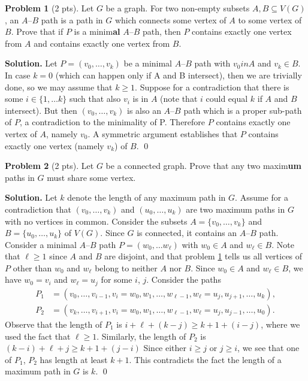 \documentclass[11pt]{scrartcl}
\theoremstyle{definition}
\newtheorem{problem}{Problem}
\newenvironment{solution}{\noindent\textbf{Solution.}}{\qed}
\begin{document}
\hrulefill

\begin{problem}[2 pts]\label{abpath}
Let $G$ be a graph.
For two non-empty subsets $A,B\subseteq V(G)$, an $A$--$B$ path is a path in $G$ which connects some vertex of $A$ to some vertex of $B$.
Prove that if $P$ is a minim\textbf{al} $A$--$B$ path, then $P$ contains exactly one vertex from $A$ and contains exactly one vertex from $B$.
\end{problem}
\begin{solution}
Let $P = (v_0,\dots,v_k)$ be a minimal $A$--$B$ path with $v_0 in A$ and $v_k \in B$. In case $k=0$ (which can happen only if A and B intersect), then we are trivially done, so we may assume that $k\geq1$. Suppose for a contradiction that there is some $i \in \{1, \dots k\}$ such that also $v_i$ is in $A$ (note that $i$ could equal $k$ if $A$ and $B$ intersect). But then $(v_0,\dots,v_k)$ is also an $A$--$B$ path which is a proper sub-path of $P$, a contradiction to the minimality of P. Therefore $P$ contains exactly one vertex of $A$, namely $v_0$. A symmetric argument establishes that $P$ contains exactly one vertex (namely $v_k$) of $B$.
\end{solution}

\hrulefill

\begin{problem}[2 pts]
Let $G$ be a connected graph.
Prove that any two maxim\textbf{um} paths in $G$ must share some vertex.
\end{problem}
\begin{solution}
Let $k$ denote the length of any maximum path in $G$. Assume for a contradiction that $(v_0,\dots, v_k)$ and $(u_0,\dots, u_k)$ are two maximum paths in $G$ with no vertices in common. Consider the subsets $A=\{v_0,\dots, v_k\}$ and $B=\{u_0,\dots, u_k\}$ of $V(G)$. Since $G$ is connected, it contains an $A$--$B$ path. Consider a minimal $A$--$B$ path $P=(w_0, \dots w_\ell)$ with $w_0\in A$ and $w_\ell \in B$. Note that $\ell \geq 1$ since $A$ and $B$ are disjoint, and that problem \ref{abpath} tells us all vertices of $P$ other than $w_0$ and $w_\ell$ belong to neither $A$ nor $B$. Since $w_0\in A$ and $w_\ell\in B$, we have $w_0=v_i$ and $w_\ell=u_j$ for some $i$, $j$. Consider the paths 
\begin{align*}
P_1&=(v_0, \dots, v_{i-1}, v_i=w_0, w_1, \dots, w_{\ell-1}, w_\ell=u_j, u_{j+1}, \dots,u_k), \\
P_2&=(v_{k}, \dots, v_{i+1}, v_i=w_0, w_1, \dots, w_{\ell-1}, w_\ell=u_j, u_{j-1}, \dots, u_0).
\end{align*}
Observe that the length of $P_1$ is $i+\ell+(k-j)\geq k+1+(i-j)$, where we used the fact that $\ell\geq 1$. Similarly, the length of $P_2$ is $(k-i)+\ell+j\geq k+1+(j-i)$
Since either $i\geq j$ or $j\geq i$, we see that one of $P_1$, $P_2$ has length at least $k+1$. This contradicts the fact the length of a maximum path in $G$ is $k$.
\end{solution}
\end{document}
